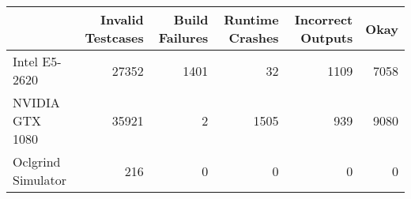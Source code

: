 \begin{tabular}{lrrrrr}
\toprule
{} &  Invalid Testcases &  Build Failures &  Runtime Crashes &  Incorrect Outputs &  Okay \\
\midrule
Intel E5-2620      &              27352 &            1401 &               32 &               1109 &  7058 \\
NVIDIA GTX 1080    &              35921 &               2 &             1505 &                939 &  9080 \\
Oclgrind Simulator &                216 &               0 &                0 &                  0 &     0 \\
\bottomrule
\end{tabular}
